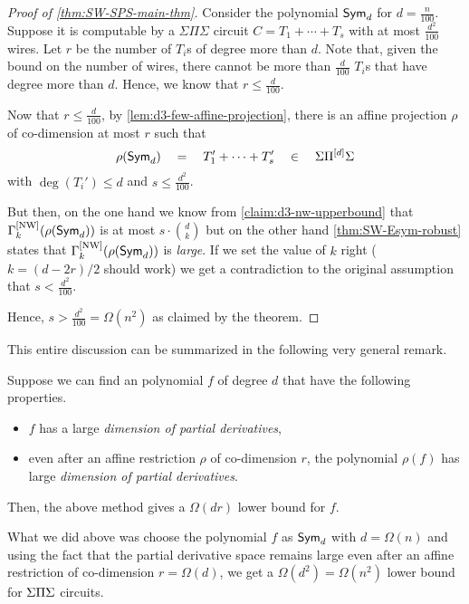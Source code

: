 \begin{proof}[Proof of \autoref{thm:SW-SPS-main-thm}]
Consider the polynomial $\operatorname{\mathsf{Sym}}_d$ for $d = \frac{n}{100}$. Suppose it is computable by a $\Sigma\Pi\Sigma$ circuit $C = T_1 + \cdots + T_s$ with at most $\frac{d^2}{100}$ wires. Let $r$ be the number of $T_i$s of degree more than $d$. Note that, given the bound on the number of wires, there cannot be more than $\frac{d}{100}$ $T_i$s that have degree more than $d$. Hence, we know that $r \leq \frac{d}{100}$. 

Now that $r \leq \frac{d}{100}$, by \autoref{lem:d3-few-affine-projection}, there is an affine projection $\rho$ of co-dimension at most $r$ such that 
\[
\rho(\operatorname{\mathsf{Sym}}_d) \quad = \quad T_1' + \cdots + T_s' \quad \in \quad \Sigma\Pi^{[d]}\Sigma
\]
with $\deg(T_i') \leq d$ and $s \leq \frac{d^2}{100}$. 

But then, on the one hand we know from \autoref{claim:d3-nw-upperbound} that $\Gamma^{\mathrm{[NW]}}_k(\rho(\operatorname{\mathsf{Sym}}_d))$ is at most $s \cdot \binom{d}{k}$ but on the other hand \autoref{thm:SW-Esym-robust} states that $\Gamma^{\mathrm{[NW]}}_k(\rho(\operatorname{\mathsf{Sym}}_d))$ is \emph{large}. If we set the value of $k$ right ($k=(d-2r)/2$ should work) we get a contradiction to the original assumption that $s < \frac{d^2}{100}$. 

Hence, $s > \frac{d^2}{100} = \Omega(n^2)$ as claimed by the theorem. 
\end{proof}

This entire discussion can be summarized in the following very general remark.

\begin{mdframed}
\begin{remark}\label{rem:meta-SW-lb}
  Suppose we can find an polynomial $f$ of degree $d$ that have the following properties. 
  \begin{itemize}
  \item $f$ has a large \emph{dimension of partial derivatives},
  \item even after an affine restriction $\rho$ of co-dimension $r$, the polynomial $\rho(f)$ has large \emph{dimension of partial derivatives}.
  \end{itemize}
  
  Then, the above method gives a $\Omega(dr)$ lower bound for $f$. 
\end{remark}
\end{mdframed}
What we did above was choose the polynomial $f$ as $\operatorname{\mathsf{Sym}}_d$ with $d = \Omega(n)$ and using the fact that the partial derivative space remains large even after an affine restriction of co-dimension $r = \Omega(d)$, we get a $\Omega(d^2) = \Omega(n^2)$ lower bound for $\Sigma\Pi\Sigma$ circuits.

